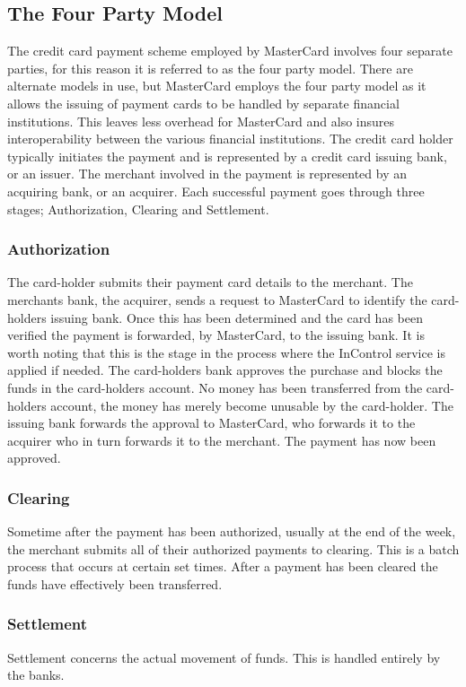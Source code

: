 \documentclass[a4paper, 11pt, titlepage]{article}
\begin{document}
\subsection{The Four Party Model} 
The credit card payment scheme employed by MasterCard involves four separate parties, for this reason it is referred to as the four party model. There are alternate models in use, but MasterCard employs the four party model as it allows the issuing of payment cards to be handled by separate financial institutions. This leaves less overhead for MasterCard and also insures interoperability between the various financial institutions. The credit card holder typically initiates the payment and is represented by a credit card issuing bank, or an issuer. The merchant involved in the payment is represented by an acquiring bank, or an acquirer. Each successful payment goes through three stages; Authorization, Clearing and Settlement. 
\subsubsection{Authorization} The card-holder submits their payment card details to the merchant. The merchants bank, the acquirer, sends a request to MasterCard to identify the card-holders issuing bank. Once this has been determined and the card has been verified the payment is forwarded, by MasterCard, to the issuing bank. It is worth noting that this is the stage in the process where the InControl service is applied if needed. The card-holders bank approves the purchase and blocks the funds in the card-holders account. No money has been transferred from the card-holders account, the money has merely become unusable by the card-holder. The issuing bank forwards the approval to MasterCard, who forwards it to the acquirer who in turn forwards it to the merchant. The payment has now been approved.  
\subsubsection{Clearing} Sometime after the payment has been authorized, usually at the end of the week, the merchant submits all of their authorized payments to clearing. This is a batch process that occurs at certain set times. After a payment has been cleared the funds have effectively been transferred. 
\subsubsection{Settlement} Settlement concerns the actual movement of funds. This is handled entirely by the banks.
 
\end{document}
